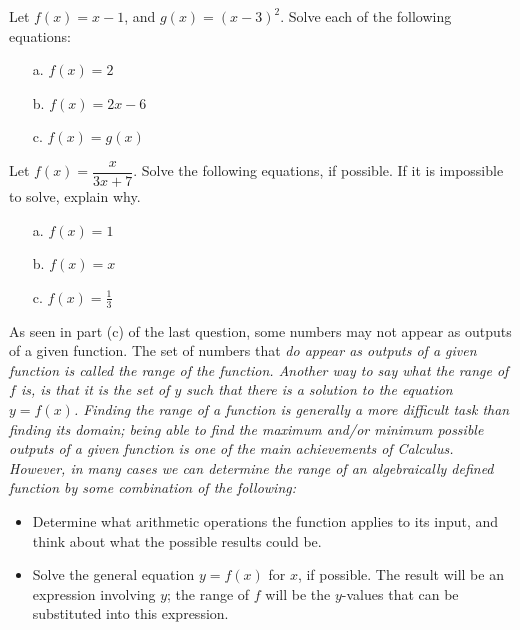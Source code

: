 \par
\begin{question}
Let $f(x) = x-1$, and $g(x) = (x-3)^2$.  Solve each of the following equations:
\begin{enumerate}
\item[a.] $f(x) = 2$
\item[b.] $f(x) = 2x-6$
\item[c.] $f(x) = g(x)$
\end{enumerate}
\end{question}


\begin{question} Let $f(x) = \dfrac{x}{3x+7}$. Solve the following equations, if possible. If it is impossible to solve, explain why.
\begin{enumerate}
\item[a.] $f(x) = 1$
\item[b.] $f(x) = x$
\item[c.] $f(x) = \frac{1}{3}$
\end{enumerate}
\end{question}

As seen in part (c) of the last question, some numbers may not appear as outputs of a given function. The set of numbers that \it{do} \normalfont appear as outputs of a given function is called the \it{range} \normalfont of the function. Another way to say what the range of $f$ is, is that it is the set of $y$ such that there is a solution to the equation $y=f(x)$. Finding the range of a function is generally a more difficult task than finding its domain; being able to find the maximum and/or minimum possible outputs of a given function is one of the main achievements of Calculus. However, in many cases we can determine the range of an algebraically defined function by some combination of the following:
\begin{itemize}
\item Determine what arithmetic operations the function applies to its input, and think about what the possible results could be.
\item Solve the general equation $y=f(x)$ for $x$, if possible. The result will be an expression involving $y$; the range of $f$ will be the $y$-values that can be substituted into this expression.
\end{itemize} 

